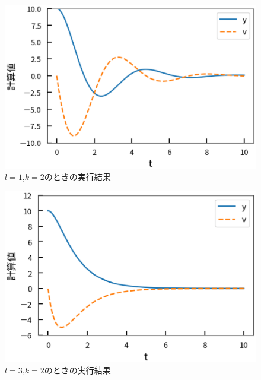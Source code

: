\documentclass[a4j]{jarticle}
\begin{document}
        \begin{figure}[H]
          \centering
          \includegraphics[scale=0.6]{l1k2.eps}
          \caption{$l=1$,$k=2$のときの実行結果}
          \label{l1k2}
          \end{figure}

      \begin{figure}[H]
      \centering
      \includegraphics[scale=0.6]{l3k2.eps}
      \caption{$l=3$,$k=2$のときの実行結果}
      \label{l3k2}
      \end{figure}
\end{document}
